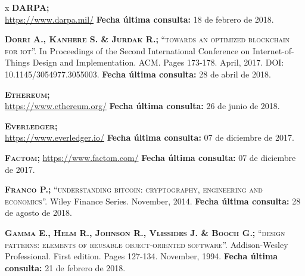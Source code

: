 \begin{thebibliography} {x}
	 \textsc{\textbf{DARPA; }} \\ 
	\url{https://www.darpa.mil/}
	\newline \textbf{Fecha última consulta:} 18 de febrero de 2018.
		
	 \textsc{\textbf{Dorri A., Kanhere S. \& Jurdak R.; }}\textsc{“towards an optimized blockchain for iot”.} In Proceedings of the Second International Conference on Internet-of-Things Design and Implementation. ACM. Pages 173-178. April, 2017. DOI: 10.1145/3054977.3055003.
	\newline \textbf{Fecha última consulta:} 28 de abril de 2018.
		
	 \textsc{\textbf{Ethereum; }} \\
	\url{https://www.ethereum.org/}
	\newline \textbf{Fecha última consulta:} 26 de junio de 2018.
	
	 \textsc{\textbf{Everledger; }} \\
	\url{https://www.everledger.io/}
	\newline \textbf{Fecha última consulta:} 07 de diciembre de 2017.
		
	 \textsc{\textbf{Factom; }} 
	\url{https://www.factom.com/}
	\newline \textbf{Fecha última consulta:} 07 de diciembre de 2017.
	
	 \textsc{\textbf{Franco P.; }}\textsc{“understanding bitcoin: cryptography, engineering and economics”.} Wiley Finance Series. November, 2014. 
	\newline \textbf{Fecha última consulta:} 28 de agosto de 2018.
		
		
		
	 \textsc{\textbf{Gamma E., Helm R., Johnson R., Vlissides J. \& Booch G.; }}\textsc{“design patterns: elements of reusable object-oriented software”.} Addison-Wesley Professional. First edition. Pages 127-134. November, 1994.
	\newline \textbf{Fecha última consulta:} 21 de febrero de 2018.
		

\end{thebibliography}
